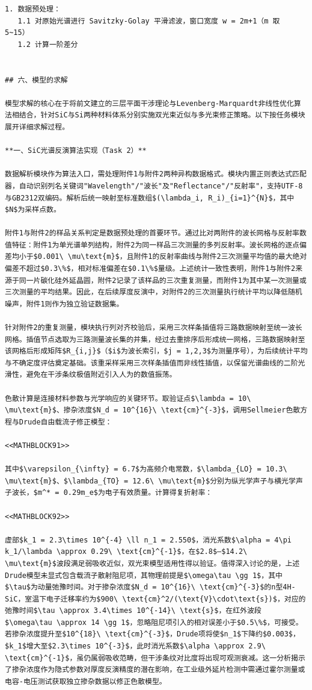 \documentclass{mcmthesis}
\begin{document}
\begin{table}[htbp]
\begin{lstlisting}
1. 数据预处理：
   1.1 对原始光谱进行 Savitzky-Golay 平滑滤波，窗口宽度 w = 2m+1（m 取 5~15）
   1.2 计算一阶差分


## 六、模型的求解

模型求解的核心在于将前文建立的三层平面干涉理论与Levenberg-Marquardt非线性优化算法相结合，针对SiC与Si两种材料体系分别实施双光束近似与多光束修正策略。以下按任务模块展开详细求解过程。

**一、SiC光谱反演算法实现（Task 2）**

数据解析模块作为算法入口，需处理附件1与附件2两种异构数据格式。模块内置正则表达式匹配器，自动识别列名关键词"Wavelength"/"波长"及"Reflectance"/"反射率"，支持UTF-8与GB2312双编码。解析后统一映射至标准数组$(\lambda_i, R_i)_{i=1}^{N}$，其中$N$为采样点数。

附件1与附件2的样品关系判定是数据预处理的首要环节。通过比对两附件的波长网格与反射率数值特征：附件1为单光谱单列结构，附件2为同一样品三次测量的多列反射率。波长网格的逐点偏差均小于$0.001\ \mu\text{m}$，且附件1的反射率曲线与附件2三次测量平均值的最大绝对偏差不超过$0.3\%$，相对标准偏差在$0.1\%$量级。上述统计一致性表明，附件1与附件2来源于同一片碳化硅外延晶圆，附件2记录了该样品的三次重复测量，而附件1为其中某一次测量或三次测量的平均结果。因此，在后续厚度反演中，对附件2的三次测量执行统计平均以降低随机噪声，附件1则作为独立验证数据集。

针对附件2的重复测量，模块执行列对齐校验后，采用三次样条插值将三路数据映射至统一波长网格。插值节点选取为三路测量波长集的并集，经过去重排序后形成统一网格，三路数据映射至该网格后形成矩阵$R_{i,j}$（$i$为波长索引，$j = 1,2,3$为测量序号），为后续统计平均与不确定度评估奠定基础。该重采样采用三次样条插值而非线性插值，以保留光谱曲线的二阶光滑性，避免在干涉条纹极值附近引入人为的数值振荡。

色散计算是连接材料参数与光学响应的关键环节。取验证点$\lambda = 10\ \mu\text{m}$、掺杂浓度$N_d = 10^{16}\ \text{cm}^{-3}$，调用Sellmeier色散方程与Drude自由载流子修正模型：

<<MATHBLOCK91>>

其中$\varepsilon_{\infty} = 6.7$为高频介电常数，$\lambda_{LO} = 10.3\ \mu\text{m}$、$\lambda_{TO} = 12.6\ \mu\text{m}$分别为纵光学声子与横光学声子波长，$m^* = 0.29m_e$为电子有效质量。计算得复折射率：

<<MATHBLOCK92>>

虚部$k_1 = 2.3\times 10^{-4} \ll n_1 = 2.550$，消光系数$\alpha = 4\pi k_1/\lambda \approx 0.29\ \text{cm}^{-1}$，在$2.8$–$14.2\ \mu\text{m}$波段满足弱吸收近似，双光束模型适用性得以验证。值得深入讨论的是，上述Drude模型未显式包含载流子散射阻尼项，其物理前提是$\omega\tau \gg 1$，其中$\tau$为动量弛豫时间。对于掺杂浓度$N_d = 10^{16}\ \text{cm}^{-3}$的n型4H-SiC，室温下电子迁移率约为$900\ \text{cm}^2/(\text{V}\cdot\text{s})$，对应的弛豫时间$\tau \approx 3.4\times 10^{-14}\ \text{s}$，在红外波段$\omega\tau \approx 14 \gg 1$，忽略阻尼项引入的相对误差小于$0.5\%$，可接受。若掺杂浓度提升至$10^{18}\ \text{cm}^{-3}$，Drude项将使$n_1$下降约$0.003$，$k_1$增大至$2.3\times 10^{-3}$，此时消光系数$\alpha \approx 2.9\ \text{cm}^{-1}$，虽仍属弱吸收范畴，但干涉条纹对比度将出现可观测衰减。这一分析揭示了掺杂浓度作为隐式参数对厚度反演精度的潜在影响，在工业级外延片检测中需通过霍尔测量或电容-电压测试获取独立掺杂数据以修正色散模型。


\end{lstlisting}
\end{table}
\end{document}
